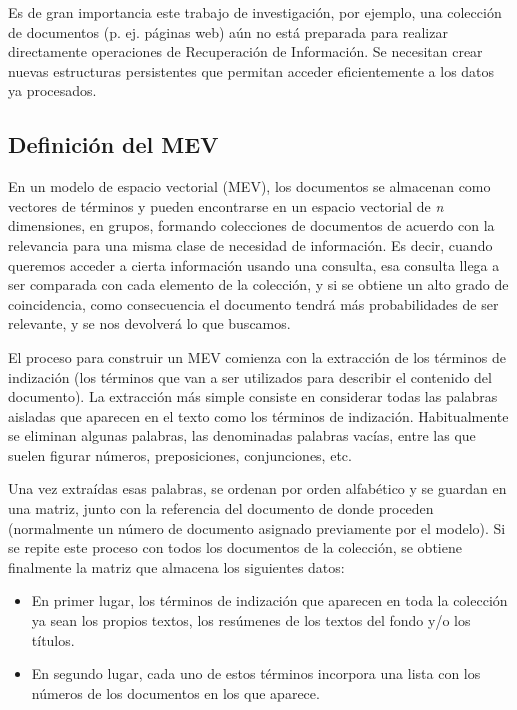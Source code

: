 \documentclass[titlepage]{article}
\begin{document}
Es de gran importancia este trabajo de investigación, por ejemplo, una colección de documentos (p. ej. páginas web) aún no está preparada para realizar directamente operaciones de Recuperación de Información. Se necesitan crear nuevas estructuras persistentes que permitan acceder eficientemente a los datos ya procesados.

\subsection{Definición del MEV}

En un modelo de espacio vectorial (MEV), los documentos se almacenan como vectores de términos y pueden encontrarse en un espacio vectorial de \textit{n} dimensiones, en grupos, formando colecciones de documentos de acuerdo con la relevancia para una misma clase de necesidad de información. Es decir, cuando queremos acceder a cierta información usando una consulta, esa consulta llega a ser comparada con cada elemento de la colección, y si se obtiene un alto grado de coincidencia, como consecuencia el documento tendrá más probabilidades de ser relevante, y se nos devolverá lo que buscamos.

El proceso para construir un MEV comienza con la extracción de los términos de indización (los términos que van a ser utilizados para describir el contenido del documento). La extracción más simple consiste en considerar todas las palabras aisladas que aparecen en el texto como los términos de indización. Habitualmente se eliminan algunas palabras, las denominadas palabras vacías, entre las que suelen figurar números, preposiciones, conjunciones, etc.

Una vez extraídas esas palabras, se ordenan por orden alfabético y se guardan en una matriz, junto con la referencia del documento de donde proceden (normalmente un número de documento asignado previamente por el modelo). Si se repite este proceso con todos los documentos de la colección, se obtiene finalmente la matriz que almacena los siguientes datos:

\begin{itemize}
	\item En primer lugar, los términos de indización que aparecen en toda la colección ya sean los propios textos, los resúmenes de los textos del fondo y/o los títulos.
	\item En segundo lugar, cada uno de estos términos incorpora una lista con los números de los documentos en los que aparece.
\end{itemize}
\end{document}
